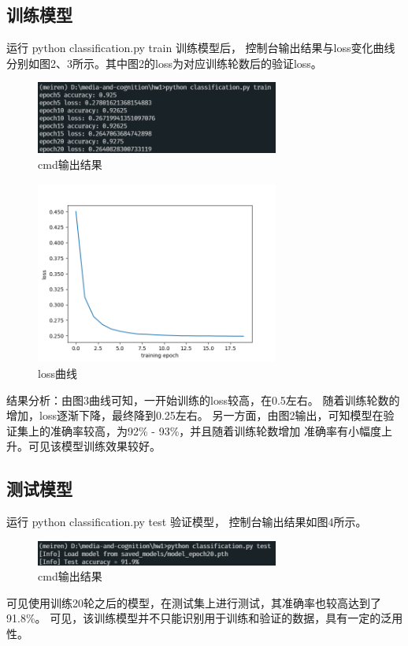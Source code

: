 \documentclass[a4paper]{article}
\begin{document}
\subsection{训练模型}
运行 python classification.py train 训练模型后，
控制台输出结果与loss变化曲线分别如图2、3所示。其中图2的loss为对应训练轮数后的验证loss。\par
\begin{figure}[hp]
    \centering
    \includegraphics[width=8cm]{image/train_cmd.png}
    \caption{cmd输出结果}
\end{figure}
\begin{figure}[hp]
    \centering
    \includegraphics[width=8cm]{image/train_figure.png}
    \caption{loss曲线}
\end{figure}
结果分析：由图3曲线可知，一开始训练的loss较高，在0.5左右。
随着训练轮数的增加，loss逐渐下降，最终降到0.25左右。
另一方面，由图2输出，可知模型在验证集上的准确率较高，为92\% - 93\%，并且随着训练轮数增加
准确率有小幅度上升。可见该模型训练效果较好。
\subsection{测试模型}
运行 python classification.py test 验证模型，
控制台输出结果如图4所示。\par
\begin{figure}[hp]
    \centering
    \includegraphics[width=8cm]{image/test_cmd.png}
    \caption{cmd输出结果}
\end{figure}
可见使用训练20轮之后的模型，在测试集上进行测试，其准确率也较高达到了91.8\%。
可见，该训练模型并不只能识别用于训练和验证的数据，具有一定的泛用性。
\end{document}
